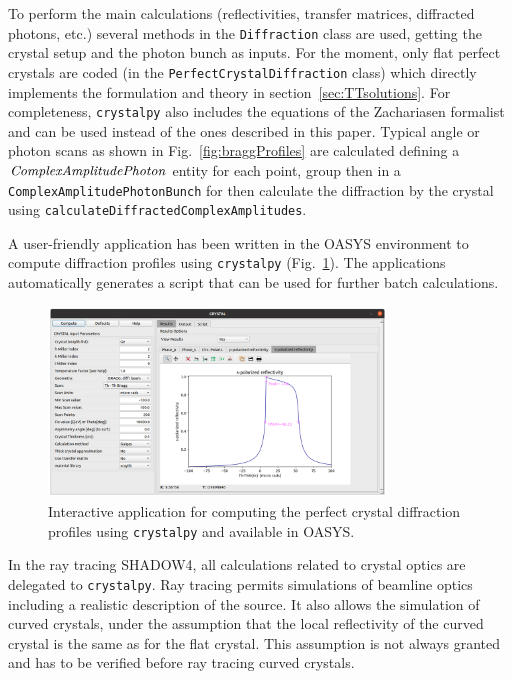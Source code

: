 \documentclass{iucr}
\newcommand{\todo}[1]{{\color{red}[TODO: "#1'']}}
\begin{document}
To perform the main calculations (reflectivities, transfer matrices, diffracted photons, etc.) several methods in the {\tt Diffraction} class are used, getting the crystal setup and the photon bunch as inputs. For the moment, only flat perfect crystals are coded (in the {\tt PerfectCrystalDiffraction} class) which directly implements the formulation and theory in section~\ref{sec:TTsolutions}. For completeness, {\tt crystalpy} also includes the equations of the Zachariasen formalist~\cite{ZachariasenBook} and can be used instead of the ones described in this paper.
Typical angle or photon scans as shown in Fig.~\ref{fig:braggProfiles} are calculated defining a $\tt ComplexAmplitudePhoton$ entity for each point, group then in a {\tt ComplexAmplitudePhotonBunch} for then calculate the diffraction by the crystal using {\tt calculateDiffractedComplexAmplitudes}.

A user-friendly application has been written in the OASYS environment to compute diffraction profiles using {\tt crystalpy} (Fig.~\ref{fig:xcrystal}). The applications automatically generates a script that can be used for further batch calculations. 

\begin{figure}
    \centering
    \includegraphics[width=0.8\textwidth]{figures/xcrystal.png}
    \caption{Interactive application for computing the perfect crystal diffraction profiles using {\tt crystalpy} and available in OASYS.  }
    \label{fig:xcrystal}
\end{figure}

In the ray tracing SHADOW4, all calculations related to crystal optics are delegated to  {\tt crystalpy}. Ray tracing permits simulations of beamline optics including a realistic description of the source. It also allows the simulation of curved crystals, under the assumption that the local reflectivity of the curved crystal is the same as for the flat crystal. This assumption is not always granted and has to be verified before ray tracing curved crystals.
\end{document}
